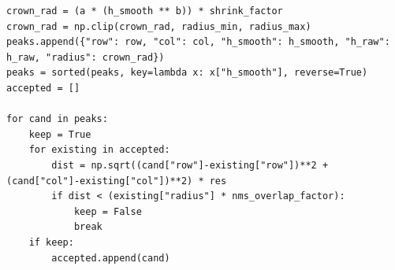 \begin{lstlisting}[label={lst:adaptiv_radius}, caption={[Adaptiver Suchradius zur Baumspitzendetektion]Dynamische Berechnung des adaptiven Suchradius}, breaklines=true, breakatwhitespace=true]
crown_rad = (a * (h_smooth ** b)) * shrink_factor
crown_rad = np.clip(crown_rad, radius_min, radius_max)
peaks.append({"row": row, "col": col, "h_smooth": h_smooth, "h_raw": h_raw, "radius": crown_rad})
peaks = sorted(peaks, key=lambda x: x["h_smooth"], reverse=True)
accepted = []

for cand in peaks:
    keep = True
    for existing in accepted:
        dist = np.sqrt((cand["row"]-existing["row"])**2 + (cand["col"]-existing["col"])**2) * res
        if dist < (existing["radius"] * nms_overlap_factor):
            keep = False
            break
    if keep:
        accepted.append(cand)
\end{lstlisting}